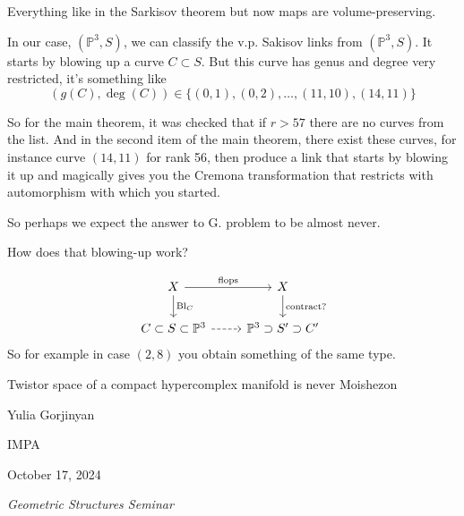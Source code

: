 \begin{thm}\leavevmode
	Everything like in the Sarkisov theorem but now maps are volume-preserving.
\end{thm}

In our case, $(\mathbb{P}^3,S)$, we can classify the v.p. Sakisov links from  $(\mathbb{P}^3,S)$. It starts by blowing up a curve $C\subset S$. But this curve has genus and degree very restricted, it's something like
\[(g(C),\operatorname{deg}(C))\in\{(0,1),(0,2),\ldots,(11,10),(14,11)\}\]

So for the main theorem, it was checked that if $r>57$ there are no curves from the list. And in the second item of the main theorem, there exist these curves, for instance curve  $(14,11)$ for rank 56, then produce a link that starts by blowing it up and magically gives you the Cremona transformation that restricts with automorphism with which you started.

\begin{remark}
	So perhaps we expect the answer to G. problem to be almost never.
\end{remark}

\begin{question}
	How does that blowing-up work?
\end{question}

\[\begin{tikzcd}
	X\arrow[r,"\text{flops}" ]\arrow[d,"\operatorname{Bl}_C"]& X\arrow[d,"\text{contract?}" ]\\
	C\subset S\subset \mathbb{P}^3\arrow[r,dashed]&\mathbb{P}^3\supset S'\supset C'
\end{tikzcd}\]
So for example in case $(2,8)$ you obtain something of the same type.

\clearpage{}
{\Huge Twistor space of a compact hypercomplex manifold is never Moishezon}

\hfill{\Large Yulia Gorjinyan}

{\Large \hfill IMPA}

\hfill{\large October 17, 2024

\hfill \textit{Geometric Structures Seminar}}
\vspace{2em}

